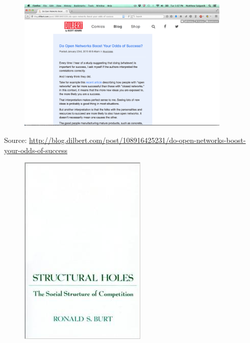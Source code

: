 \documentclass[aspectratio=169]{beamer}
\begin{document}
\begin{frame}

\begin{figure}
  \centering
  \includegraphics[width=0.9\textwidth]{figures/adams_do_2015}
\end{figure}

\tiny{Source: \url{http://blog.dilbert.com/post/108916425231/do-open-networks-boost-your-odds-of-success}}


\end{frame}
\begin{frame}

\begin{figure}
  \centering
  \includegraphics[height=0.8\textheight]{figures/burt_structural_1995}
\end{figure}


\end{frame}
\end{document}
